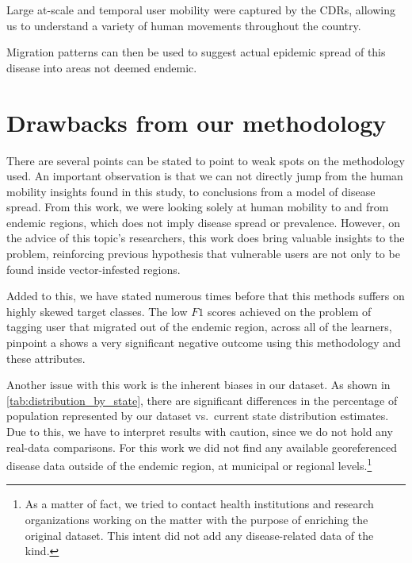 Large at-scale and temporal user mobility were captured by the CDRs, allowing us to understand a variety of human movements throughout the country.




Migration patterns can then be used to suggest actual epidemic spread of this disease into areas not deemed endemic.



\section{Drawbacks from our methodology}

There are several points can be stated to point to weak spots on the methodology used.
An important observation is that we can not directly jump from the human mobility insights found in this study, to conclusions from a model of disease spread.
From this work, we were looking solely at human mobility to and from endemic regions, which does not imply disease spread or prevalence.
However, on the advice of this topic's researchers, this work does bring valuable insights to the problem, reinforcing previous hypothesis that vulnerable users are not only to be found inside vector-infested regions.


Added to this, we have stated numerous times before that this methods suffers on highly skewed target classes.
The low $F1$ scores achieved on the problem of tagging user that migrated out of the endemic region, across all of the learners, pinpoint a shows a very significant negative outcome using this methodology and these attributes.

Another issue with this work is the inherent biases in our dataset.
As shown in \cref{tab:distribution_by_state}, there are significant differences in the percentage of population represented by our dataset vs.\ current state distribution estimates.
Due to this, we have to interpret results with caution, since we do not hold any real-data comparisons.
For this work we did not find any available georeferenced disease data outside of the endemic region, at municipal or regional levels.\footnote{As a matter of fact, we tried to contact health institutions and research organizations working on the matter with the purpose of enriching the original dataset.
This intent did not add any disease-related data of the kind.}


